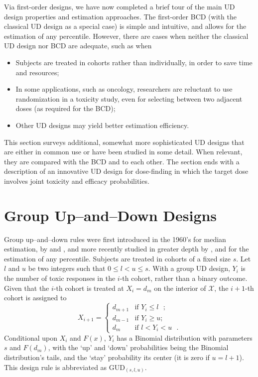 Via first-order designs, we have now completed a brief tour of the main UD design properties and estimation approaches. The first-order BCD (with the classical UD design as a special case) is simple and intuitive, and allows for the estimation of any percentile. However, there are cases when neither the classical UD design nor BCD are adequate, such as when
\begin{itemize}
\item Subjects are treated in cohorts rather than individually, in order to save time and resources;
\item In some applications, such as oncology, researchers are reluctant to use randomization in a toxicity study, even for selecting between two adjacent doses (as required for the BCD);
\item Other UD designs may yield better estimation efficiency.
\end{itemize}
This section surveys additional, somewhat more sophisticated UD designs that are either in common use or have been studied in some detail. When relevant, they are compared with the BCD and to each other. The section ends with a description of an innovative UD design for dose-finding in which the target dose involves joint toxicity and efficacy probabilities.

\section{Group Up--and--Down Designs}\label{sec:gud}

Group up--and--down rules were first introduced in the 1960's for median estimation, by \cite{Weth:Sequ:1963} and \cite{Tsut:asym:1967,Tsut:rand:1967}, and more recently studied in greater depth by \cite{Gezm:Flou:Grou:2006}, \cite{Ivan:esca:2006} and \cite{Bald:Bort:Giov:2008} for the estimation of any percentile. Subjects are treated in cohorts of a fixed size $s$. Let $l$ and $u$ be two integers such that $0\le l< u\le s$. With a group UD design, $Y_i$ is the number of toxic responses in the $i$-th cohort, rather than a binary outcome. Given that the $i$-th cohort is treated at $X_i=d_m$ on the interior of $\mathcal{X}$, the $i+1$-th cohort is assigned to
%
\begin{equation*}
X_{i+1}=
\begin{cases}
d_{m+1} &\textrm{if $Y_i\le l$ };\\
d_{m-1} &\textrm{if $Y_i\ge u$};\\
d_m &\textrm{if $l<Y_i<u$ }.
\end{cases}
\end{equation*}
%
Conditional upon $X_i$ and $F(x)$, $Y_i$ has a Binomial distribution with parameters $s$ and $F(d_m)$, with the `up' and `down' probabilities being the Binomial distribution's tails, and the `stay' probability its center (it is zero if $u=l+1$). This design rule is abbreviated as GUD$_{(s,l,u)}$.

